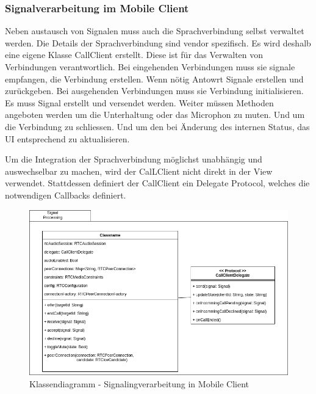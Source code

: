 \clearpage

\subsubsection{Signalverarbeitung im Mobile Client}

Neben austausch von Signalen muss auch die Sprachverbindung selbst verwaltet werden.
Die Details der Sprachverbindung sind vendor spezifisch.
Es wird deshalb eine eigene Klasse CallClient erstellt.
Diese ist für das Verwalten von Verbindungen verantwortlich.
Bei eingehenden Verbindungen muss sie signale empfangen, die Verbindung erstellen.
Wenn nötig Antowrt Signale erstellen und zurückgeben.
Bei ausgehenden Verbindungen muss sie Verbindung initialisieren.
Es muss Signal erstellt und versendet werden.
Weiter müssen Methoden angeboten werden um die Unterhaltung oder das Microphon zu muten.
Und um die Verbindung zu schliessen.
Und um den bei Änderung des internen Status, das UI entsprechend zu aktualisieren.

Um die Integration der Sprachverbindung möglichst unabhängig und auswechselbar zu machen, wird der CalLClient nicht direkt in der View verwendet.
Stattdessen definiert der CallClient ein Delegate Protocol, welches die notwendigen Callbacks definiert.

\begin{figure}[h]
    \centering
    \begin{minipage}[b]{0.9\textwidth}
        \includegraphics[width=\textwidth]{graphics/diagramms/Class_Mobile_Client_Signal_Processing}
        \caption{Klassendiagramm - Signalingverarbeitung in Mobile Client}
    \end{minipage}
\end{figure}

